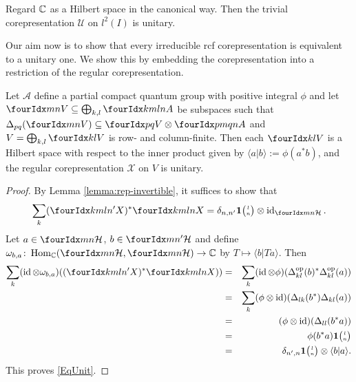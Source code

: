 \begin{Exa}\label{example:rep-trivial-unitary}
  Regard $\mathbb{C}$ as a Hilbert space in the canonical way. Then the
  trivial corepresentation $\mathscr{U}$ on $l^{2}(I)$ is unitary.
\end{Exa}
Our aim now is to show that every irreducible rcf corepresentation is
equivalent to a unitary one. We show this by embedding the
corepresentation into a restriction of the regular corepresentation.
\begin{Lem} \label{lemma:rep-regular-unitary}
  Let $\mathscr{A}$ define a partial compact quantum group with
positive  integral $\phi$ and let $\Gru{V}{m}{n} \subseteq
\bigoplus_{k,l} \Gr{A}{k}{l}{m}{n}$ be subspaces such that
$\Delta_{pq}(\Gru{V}{m}{n}) \subseteq \Gru{V}{p}{q} \otimes
    \Gr{A}{p}{q}{m}{n}$ and $V=\bigoplus_{k,l} \Gru{V}{k}{l}$ is row-
    and column-finite. Then each $\Gru{V}{k}{l}$ is a Hilbert space with
    respect to the inner product given by $\langle
    a|b\rangle:=\phi(a^{*}b)$, and the regular corepresentation
    $\mathscr{X}$ on $V$ is unitary.
\end{Lem}
\begin{proof} 
By Lemma \ref{lemma:rep-invertible},  it suffices to show that
  \begin{equation}\label{EqUnit} \sum_{k}
    (\Gr{X}{k}{l}{m}{n'})^* \Gr{X}{k}{l}{m}{n} =
    \delta_{n,n'}\UnitC{l}{n}\otimes
    \id_{\Gru{\Hsp}{m}{n}}.
  \end{equation} 
Let  $a\in \Gru{\Hsp}{m}{n}$, $b\in \Gru{\Hsp}{m}{n'}$ and define $\omega_{b,a} \colon
\Hom_{\C}(\Gru{\Hsp}{m}{n},\Gru{\Hsp}{m}{n}) \to \C$ by $T
\mapsto \langle b|Ta\rangle$. Then
\begin{eqnarray*}
\sum_{k }(\id \otimes \omega_{b,a})
((\Gr{X}{k}{l}{m}{n'})^* \Gr{X}{k}{l}{m}{n}))  &=& \sum_k
(\id\otimes \phi)(\Delta_{kl}^{\op}(b)^*\Delta_{kl}^{\op}(a))\\
  &=& \sum_k (\phi\otimes
  \id)(\Delta_{lk}(b^*)\Delta_{kl}(a)) \\ &=& (\phi\otimes
  \id)(\Delta_{ll}(b^*a)) \\ &=& \phi(b^*a)\UnitC{l}{n} \\&=&
  \delta_{n',n} \UnitC{l}{n} \otimes \langle b|a\rangle.
\end{eqnarray*} 
This proves \eqref{EqUnit}.
\end{proof} 


